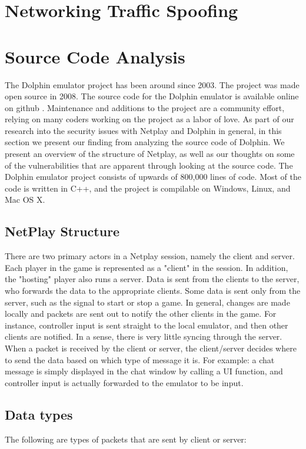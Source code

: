 \documentclass[conference]{IEEEtran}
\begin{document}
\section{ Networking Traffic Spoofing }

\section{Source Code Analysis}
The Dolphin emulator project has been around since 2003.
The project was made open source in 2008.
The source code for the Dolphin emulator is available online on github \cite{github-dolphin}.
Maintenance and additions to the project are a community effort, relying on many coders working on the project as a labor of love.
As part of our research into the security issues with Netplay and Dolphin in general, in this section we present our finding from analyzing the source code of Dolphin.
We present an overview of the structure of Netplay, as well as our thoughts on some of the vulnerabilities that are apparent through looking at the source code.
The Dolphin emulator project consists of upwards of 800,000 lines of code.
Most of the code is written in C++, and the project is compilable on Windows, Linux, and Mac OS X.

\subsection{ NetPlay Structure }
There are two primary actors in a Netplay session, namely the client and server.
Each player in the game is represented as a "client" in the session.
In addition, the "hosting" player also runs a server.
Data is sent from the clients to the server, who forwards the data to the appropriate clients.
Some data is sent only from the server, such as the signal to start or stop a game.
In general, changes are made locally and packets are sent out to notify the other clients in the game.
For instance, controller input is sent straight to the local emulator, and then other clients are notified.
In a sense, there is very little syncing through the server.
When a packet is received by the client or server, the client/server decides where to send the data based on which type of message it is.
For example: a chat message is simply displayed in the chat window by calling a UI function, and controller input is actually forwarded to the emulator to be input.

\subsection{Data types}
The following are types of packets that are sent by client or server:
\end{document}
